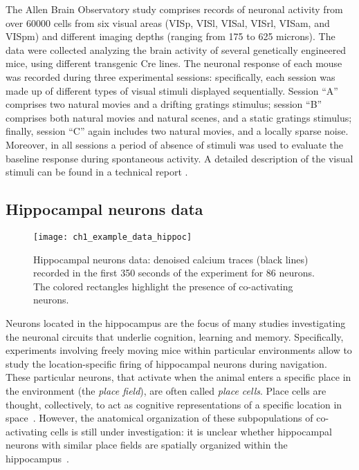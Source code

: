 The Allen Brain Observatory study comprises records of neuronal activity from over $60000$ cells from six visual areas (VISp, VISl, VISal, VISrl, VISam, and VISpm) and different imaging depths (ranging from 175 to 625 microns). The data were collected analyzing the brain activity of several genetically engineered mice, using different transgenic Cre lines.
The neuronal response of each mouse was recorded during three experimental sessions: specifically, each session was made up of different types of visual stimuli displayed sequentially.
Session ``A'' comprises two natural movies and a drifting gratings stimulus; session ``B'' comprises both natural movies and natural scenes, and a static gratings stimulus; finally, session ``C'' again includes two natural movies, and a locally sparse noise. Moreover, in all sessions a period of absence of stimuli was used to evaluate the baseline response during spontaneous activity. 
A detailed description of the visual stimuli can be found in a technical report \parencite{allen_stimulus}.





\subsection{Hippocampal neurons data}
\label{ch1_sec:hippoc_data}
\begin{figure}
	\centering
	\texttt{[image: ch1\_example\_data\_hippoc]}
	\caption[Calcium traces of 88 neurons from the hippocampal neurons data.]{Hippocampal neurons data: denoised calcium traces (black lines) recorded in the first 350 seconds of the experiment for 86 neurons. The colored rectangles highlight the presence of co-activating neurons.}\label{ch1_fig:data_hippoc}
\end{figure}

Neurons located in the hippocampus are the focus of many studies investigating the neuronal circuits that underlie cognition, learning and memory.
Specifically, experiments involving freely moving mice within particular environments allow to study the location-specific firing of hippocampal neurons during navigation. These particular neurons, that activate when the animal enters a specific place in the environment (the \textit{place field}), are often called \textit{place cells}. Place cells are thought, collectively, to act as cognitive representations of a specific location in space~\parencite{okeefe1978}. However, the anatomical organization of these subpopulations of co-activating cells is still under investigation: it is unclear whether hippocampal neurons with similar place fields are spatially organized within the hippocampus~\parencite{dombeck2010}.

